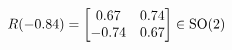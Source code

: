 \documentclass[preview]{standalone}
\begin{document}
\begin{align*}
\special{dvisvgm:raw <g id='unique000'>}R(-0.84) = \begin{bmatrix} 0.67 & 0.74 \\ -0.74 & 0.67 \end{bmatrix} \in \text{SO}(2)\special{dvisvgm:raw </g>}
\end{align*}
\end{document}
